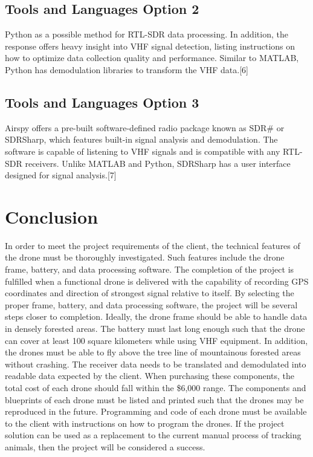 \documentclass[onecolumn, draftclsnofoot,10pt, compsoc]{IEEEtran}
\begin{document}
\subsection{Tools and Languages Option 2}
Python as a possible method for RTL-SDR data processing. In addition, the response offers heavy insight into VHF signal detection, listing instructions on how to optimize data collection quality and performance. Similar to MATLAB, Python has demodulation libraries to transform the VHF data.[6]
\subsection{Tools and Languages Option 3}
Airspy offers a pre-built software-defined radio package known as SDR\# or SDRSharp, which features built-in signal analysis and demodulation. The software is capable of listening to VHF signals and is compatible with any RTL-SDR receivers. Unlike MATLAB and Python, SDRSharp has a user interface designed for signal analysis.[7]

\section{Conclusion}
In order to meet the project requirements of the client, the technical features of the drone must be thoroughly investigated. Such features include the drone frame, battery, and data processing software. The completion of the project is fulfilled when a functional drone is delivered with the capability of recording GPS coordinates and direction of strongest signal relative to itself. By selecting the proper frame, battery, and data processing software, the project will be several steps closer to completion. Ideally, the drone frame should be able to handle data in densely forested areas. The battery must last long enough such that the drone can cover at least 100 square kilometers while using VHF equipment. In addition, the drones must be able to fly above the tree line of mountainous forested areas without crashing. The receiver data needs to be translated and demodulated into readable data expected by the client. When purchasing these components, the total cost of each drone should fall within the \$6,000 range. The components and blueprints of each drone must be listed and printed such that the drones may be reproduced in the future. Programming and code of each drone must be available to the client with instructions on how to program the drones. If the project solution can be used as a replacement to the current manual process of tracking animals, then the project will be considered a success.

\nocite{*}

\end{document}
